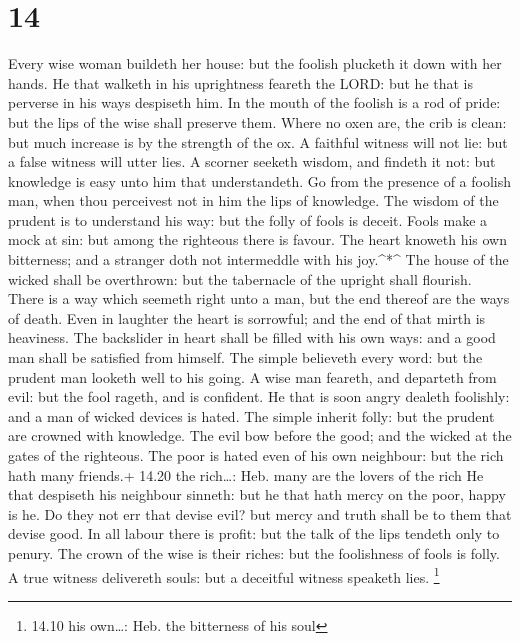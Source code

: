 \hypertarget{section-13}{%
\section{14}\label{section-13}}

 Every wise woman buildeth her house: but the foolish
plucketh it down with her hands.  He that walketh in his
uprightness feareth the LORD: but he that is perverse in his ways
despiseth him.  In the mouth of the foolish is a rod of
pride: but the lips of the wise shall preserve them.  Where
no oxen are, the crib is clean: but much increase is by the strength of
the ox.  A faithful witness will not lie: but a false
witness will utter lies.  A scorner seeketh wisdom, and
findeth it not: but knowledge is easy unto him that understandeth.
 Go from the presence of a foolish man, when thou perceivest
not in him the lips of knowledge.  The wisdom of the prudent
is to understand his way: but the folly of fools is deceit. 
Fools make a mock at sin: but among the righteous there is favour.
 The heart knoweth his own bitterness; and a stranger doth
not intermeddle with his joy.\^{}*\^{}  The house of the
wicked shall be overthrown: but the tabernacle of the upright shall
flourish.  There is a way which seemeth right unto a man,
but the end thereof are the ways of death.  Even in
laughter the heart is sorrowful; and the end of that mirth is heaviness.
 The backslider in heart shall be filled with his own ways:
and a good man shall be satisfied from himself.  The simple
believeth every word: but the prudent man looketh well to his going.
 A wise man feareth, and departeth from evil: but the fool
rageth, and is confident.  He that is soon angry dealeth
foolishly: and a man of wicked devices is hated.  The
simple inherit folly: but the prudent are crowned with knowledge.
 The evil bow before the good; and the wicked at the gates
of the righteous.  The poor is hated even of his own
neighbour: but the rich hath many friends.+ 14.20 the rich\ldots: Heb.
many are the lovers of the rich  He that despiseth his
neighbour sinneth: but he that hath mercy on the poor, happy is he.
 Do they not err that devise evil? but mercy and truth
shall be to them that devise good.  In all labour there is
profit: but the talk of the lips tendeth only to penury. 
The crown of the wise is their riches: but the foolishness of fools is
folly.  A true witness delivereth souls: but a deceitful
witness speaketh lies. \footnote{14.10 his own\ldots: Heb. the
  bitterness of his soul}

